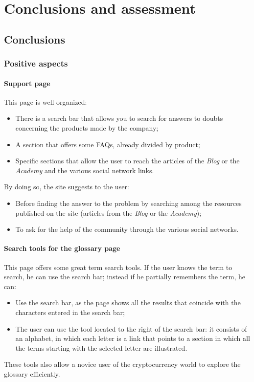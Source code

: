 \section{Conclusions and assessment}

\subsection{Conclusions}

\subsubsection{Positive aspects}

\paragraph{Support page}

This page is well organized:
\begin{itemize}
  \item There is a search bar that allows you to search for answers to 
  doubts concerning the products made by the company;

  \item A section that offers some FAQs, already divided by product;
  
  \item Specific sections that allow the user to reach the articles of the 
  \textit{Blog} or the \textit{Academy} and the various social network 
  links.
\end{itemize}
By doing so, the site suggests to the user:
\begin{itemize}
  \item Before finding the answer to the problem by searching among the 
  resources published on the site (articles from the \textit{Blog} or 
  the \textit{Academy});

  \item To ask for the help of the community through the various social 
  networks.
\end{itemize}


\paragraph{Search tools for the glossary page}

This page offers some great term search tools. If the user knows the term 
to search, he can use the search bar; instead if he partially remembers 
the term, he can:
\begin{itemize}
  \item Use the search bar, as the page shows all the results that 
  coincide with the characters entered in the search bar;

  \item The user can use the tool located to the right of the search bar: 
  it consists of an alphabet, in which each letter is a link that points 
  to a section in which all the terms starting with the selected letter 
  are illustrated.
\end{itemize}
These tools also allow a novice user of the cryptocurrency world to 
explore the glossary efficiently.

